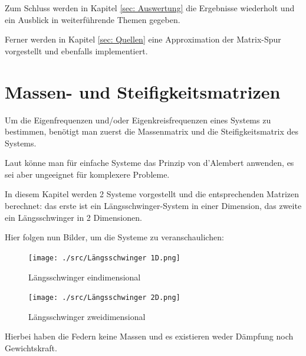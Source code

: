\documentclass[ngerman,BCOR=4mm]{tudscrreprt}
\theoremstyle{plain} %
\theoremstyle{definition} %
\theoremstyle{remark}
\begin{document}
      Zum Schluss werden in Kapitel \ref{sec: Auswertung} die Ergebnisse wiederholt und ein Ausblick in weiterführende Themen gegeben.

      Ferner werden in Kapitel \ref{sec: Quellen} eine Approximation der Matrix-Spur vorgestellt und ebenfalls implementiert.

\chapter{Massen- und Steifigkeitsmatrizen}
\label{sec: MS Matrizen}
      Um die Eigenfrequenzen und/oder Eigenkreisfrequenzen \w eines Systems zu bestimmen, benötigt man zuerst die Massenmatrix \M und die Steifigkeitsmatrix \K des Systems.

      Laut \cite[S. 366]{maschinendynamikDresig} könne man für einfache Systeme das Prinzip von d'Alembert anwenden, es sei aber ungeeignet für komplexere Probleme.
            
      In diesem Kapitel werden 2 Systeme vorgestellt und die entsprechenden Matrizen berechnet:
      das erste ist ein Längsschwinger-System in einer Dimension, das zweite ein Längsschwinger in 2 Dimensionen.
      

      Hier folgen nun Bilder, um die Systeme zu veranschaulichen:

      \begin{figure}[ht]
            \centering
            \begin{minipage}[ht]{0.49\linewidth}
                  \centering
                  \texttt{[image: ./src/Längsschwinger 1D.png]}
                  \caption{Längsschwinger eindimensional}
                  \label{fig: Längsschwinger 1d}
            \end{minipage}
            \hfill
            \begin{minipage}[ht]{0.49\linewidth}
                  \centering
                  \texttt{[image: ./src/Längsschwinger 2D.png]}
                  \caption{Längsschwinger zweidimensional}
                  \label{fig: Längsschwinger 2d}
            \end{minipage}
      \end{figure}

      Hierbei haben die Federn keine Massen und es existieren weder Dämpfung noch Gewichtskraft.
\end{document}
